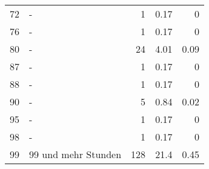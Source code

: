 \begin{longtable}{lXrrr}
        72 & \multicolumn{1}{X}{-} & %
          \num{1} &
          \num[round-mode=places,round-precision=2]{0,17} &
          \num[round-mode=places,round-precision=2]{0} \\

        76 & \multicolumn{1}{X}{-} & %
          \num{1} &
          \num[round-mode=places,round-precision=2]{0,17} &
          \num[round-mode=places,round-precision=2]{0} \\

        80 & \multicolumn{1}{X}{-} & %
          \num{24} &
          \num[round-mode=places,round-precision=2]{4,01} &
          \num[round-mode=places,round-precision=2]{0,09} \\

        87 & \multicolumn{1}{X}{-} & %
          \num{1} &
          \num[round-mode=places,round-precision=2]{0,17} &
          \num[round-mode=places,round-precision=2]{0} \\

        88 & \multicolumn{1}{X}{-} & %
          \num{1} &
          \num[round-mode=places,round-precision=2]{0,17} &
          \num[round-mode=places,round-precision=2]{0} \\

        90 & \multicolumn{1}{X}{-} & %
          \num{5} &
          \num[round-mode=places,round-precision=2]{0,84} &
          \num[round-mode=places,round-precision=2]{0,02} \\

        95 & \multicolumn{1}{X}{-} & %
          \num{1} &
          \num[round-mode=places,round-precision=2]{0,17} &
          \num[round-mode=places,round-precision=2]{0} \\

        98 & \multicolumn{1}{X}{-} & %
          \num{1} &
          \num[round-mode=places,round-precision=2]{0,17} &
          \num[round-mode=places,round-precision=2]{0} \\

        99 & \multicolumn{1}{X}{99 und mehr Stunden} & %
          \num{128} &
          \num[round-mode=places,round-precision=2]{21,4} &
          \num[round-mode=places,round-precision=2]{0,45} \\


\end{longtable}
